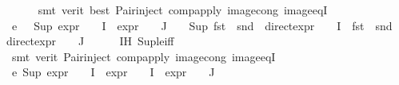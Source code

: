 \begin{isabellebody}
\ \ \ \ \isamarkupfalse%
\ {\isacharparenleft}{\kern0pt}smt\ {\isacharparenleft}{\kern0pt}verit{\isacharcomma}{\kern0pt}\ best{\isacharparenright}{\kern0pt}\ Pair{\isacharunderscore}{\kern0pt}inject\ comp{\isacharunderscore}{\kern0pt}apply\ image{\isacharunderscore}{\kern0pt}cong\ image{\isacharunderscore}{\kern0pt}eqI{\isacharparenright}{\kern0pt}\isanewline
\ \ \isamarkupfalse%
\ e{}{\isacharcolon}{\kern0pt}\ {\isachardoublequoteopen}{}\ {\isacharplus}{\kern0pt}\ Sup\ {\isacharparenleft}{\kern0pt}{\isacharparenleft}{\kern0pt}expr{\isacharunderscore}{\kern0pt}{}\ {\isasymcirc}\ {\isasymPhi}{\isacharparenright}{\kern0pt}\ {\isacharbackquote}{\kern0pt}\ I\ {\isasymunion}\ {\isacharparenleft}{\kern0pt}expr{\isacharunderscore}{\kern0pt}{}\ {\isasymcirc}\ {\isasymPhi}{\isacharparenright}{\kern0pt}\ {\isacharbackquote}{\kern0pt}\ J{\isacharparenright}{\kern0pt}\ {\isacharequal}{\kern0pt}\ {}\ {\isacharplus}{\kern0pt}\ Sup\ {\isacharparenleft}{\kern0pt}{\isacharparenleft}{\kern0pt}fst\ {\isasymcirc}\ snd\ {\isasymcirc}\ direct{\isacharunderscore}{\kern0pt}expr\ {\isasymcirc}\ {\isasymPhi}{\isacharparenright}{\kern0pt}\ {\isacharbackquote}{\kern0pt}\ I\ {\isasymunion}\ {\isacharparenleft}{\kern0pt}fst\ {\isasymcirc}\ snd\ {\isasymcirc}\ direct{\isacharunderscore}{\kern0pt}expr\ {\isasymcirc}\ {\isasymPhi}{\isacharparenright}{\kern0pt}\ {\isacharbackquote}{\kern0pt}\ J{\isacharparenright}{\kern0pt}{\isachardoublequoteclose}\isanewline
\ \ \ \ \isamarkupfalse%
\ IH\ Sup{\isacharunderscore}{\kern0pt}le{\isacharunderscore}{\kern0pt}iff\ \isanewline
\ \ \ \ \isamarkupfalse%
\ {\isacharparenleft}{\kern0pt}smt\ {\isacharparenleft}{\kern0pt}verit{\isacharparenright}{\kern0pt}\ Pair{\isacharunderscore}{\kern0pt}inject\ comp{\isacharunderscore}{\kern0pt}apply\ image{\isacharunderscore}{\kern0pt}cong\ image{\isacharunderscore}{\kern0pt}eqI{\isacharparenright}{\kern0pt}\isanewline
\ \ \isamarkupfalse%
\ e{}{\isacharcolon}{\kern0pt}\ {\isachardoublequoteopen}{\isacharparenleft}{\kern0pt}Sup\ {\isacharparenleft}{\kern0pt}{\isacharparenleft}{\kern0pt}expr{\isacharunderscore}{\kern0pt}{}\ {\isasymcirc}\ {\isasymPhi}{\isacharparenright}{\kern0pt}\ {\isacharbackquote}{\kern0pt}\ I\ {\isasymunion}\ {\isacharparenleft}{\kern0pt}expr{\isacharunderscore}{\kern0pt}{}\ {\isasymcirc}\ {\isasymPhi}{\isacharparenright}{\kern0pt}\ {\isacharbackquote}{\kern0pt}\ I\ {\isasymunion}\ {\isacharparenleft}{\kern0pt}expr{\isacharunderscore}{\kern0pt}{}\ {\isasymcirc}\ {\isasymPhi}{\isacharparenright}{\kern0pt}\ {\isacharbackquote}{\kern0pt}\ J{\isacharparenright}{\kern0pt}{\isacharparenright}{\kern0pt}\ {\isacharequal}{\kern0pt}\isanewline

\end{isabellebody}
